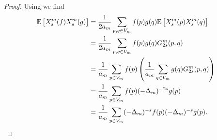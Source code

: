 \vspace{-0.7em}
\begin{proof}
	Using  we find
	\begin{align}
		\e \left[X_s^{m}(f)X_s^{m}(g)\right] &= \frac{1}{2a_m} \sum_{p,q \in V_m}f(p)g(q)\e\left[X_s^{m}(p)X_s^{m}(q)\right] \\
		&=  \frac{1}{2a_m} \sum_{p,q \in V_m}f(p)g(q)G_{2s}^{m}(p,q) \\
		&= \frac{1}{a_m} \sum_{p \in V_m}f(p)\left(\frac{1}{a_m} \sum_{q \in V_m}g(q)G_{2s}^{m}(p,q)\right) \\
		& = \frac{1}{a_m} \sum_{p \in V_m}f(p)(-\Delta_{m})^{-2s}g(p) \\
		& = \frac{1}{a_m} \sum_{p \in V_m} (-\Delta_{m})^{-s}f(p)(-\Delta_{m})^{-s}g(p).
	\end{align}
\end{proof}

